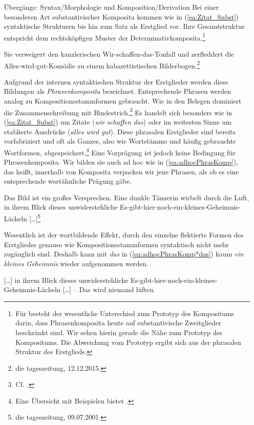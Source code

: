 \begin{Exkurs}{Übergänge: Syntax/Morphologie und Komposition/Derivation}
Bei einer besonderen Art substantivischer Komposita kommen wie in (\ref{ea:Zitat_Subst}) syntaktische Strukturen bis hin zum Satz als Erstglied vor. Ihre Gesamtstruktur entspricht dem rechtsköpfigen Muster der Determinativkomposita.\footnote{Für \citet[43]{Hein2015} besteht der wesentliche Unterschied zum Prototyp des Kompositums darin, dass Phrasenkomposita heute auf substantivische Zweitglieder beschränkt sind. Wir sehen hierin gerade die Nähe zum Prototyp des Kompositums. Die Abweichung vom Prototyp ergibt sich aus der phrasalen Struktur des Erstglieds.}


\ea \label{ea:Zitat_Subst} Sie verweigert den kanzlerischen Wir-schaffen-das-Tonfall und zerfleddert die Alles-wird-gut-Komödie zu einem kabarettistischen Bilderbogen.\footnote{die tageszeitung, 12.12.2015.}
\z 

Aufgrund der internen syntaktischen Struktur der Erstglieder werden diese Bildungen als \textit{Phrasenkomposita} bezeichnet. Entsprechende Phrasen werden analog zu Kompositionsstammformen gebraucht. Wie in den Belegen dominiert die Zusammenschreibung mit Bindestrich.\footnote{Cf. \citet[349--353]{Hein2015}.} Es handelt sich besonders wie in (\ref{ea:Zitat_Subst}) um Zitate (\textit{wir schaffen das}) oder im weitesten Sinne um etablierte Ausdrücke (\textit{alles wird gut}). Diese phrasalen Erstglieder sind bereits vorfabriziert und oft als Ganzes, also wie Wortstämme und häufig gebrauchte Wortformen, abgespeichert.\footnote{Eine Übersicht mit Beispielen bietet \citet[171]{Meibauer2003}.} Eine Vorprägung ist jedoch keine Bedingung für Phrasenkomposita. Wir bilden sie auch ad hoc wie in (\ref{ea:adhocPhrasKomp}), das heißt, innerhalb von Komposita verpacken wir jene Phrasen, als ob es eine entsprechende wortähnliche Prägung gäbe.

\ea \label{ea:adhocPhrasKomp} Das Bild ist ein großes Versprechen. Eine dunkle Tänzerin wirbelt durch die Luft, in ihrem Blick dieses unwiderstehliche Es-gibt-hier-noch-ein-kleines-Geheimnis-Lächeln [\ldots{}]\footnote{die tageszeitung, 09.07.2001.}
\z 

Wesentlich ist der wortbildende Effekt, durch den einzelne flektierte Formen des Erstgliedes genauso wie Kompositionsstammformen syntaktisch nicht mehr zugänglich sind. Deshalb kann mit \textit{das} in (\ref{ea:adhocPhrasKomp*das}) kaum \textit{ein kleines Geheimnis} wieder aufgenommen werden.

\ea \label{ea:adhocPhrasKomp*das} [\ldots{}] in ihrem Blick dieses unwiderstehliche Es-gibt-hier-noch-ein-kleines-Geheimnis-Lächeln [\ldots{}] -- Das wird niemand lüften.  
\z 


\end{Exkurs}
